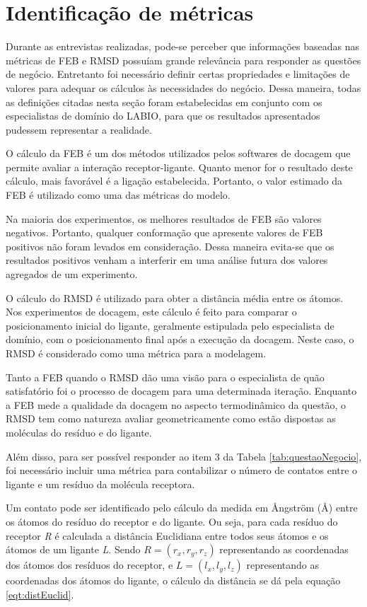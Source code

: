 \section{Identificação de métricas}
\label{sec:IdentificacaoDeMetricas}

Durante as entrevistas realizadas, pode-se perceber que informações baseadas nas métricas de FEB e RMSD possuíam grande relevância para responder as questões de negócio. Entretanto foi necessário definir certas propriedades e limitações de valores para adequar os cálculos às necessidades do negócio. Dessa maneira, todas as definições citadas nesta seção foram estabelecidas em conjunto com os especialistas de domínio do LABIO, para que os resultados apresentados pudessem representar a realidade.

O cálculo da FEB é um dos métodos utilizados pelos softwares de docagem que permite avaliar a interação receptor-ligante. Quanto menor for o resultado deste cálculo, mais favorável é a ligação estabelecida. Portanto, o valor estimado da FEB é utilizado como uma das métricas do modelo.

Na maioria dos experimentos, os melhores resultados de FEB são valores negativos. Portanto, qualquer conformação que apresente valores de FEB positivos não foram levados em consideração. Dessa maneira evita-se que os resultados positivos venham a interferir em uma análise futura dos valores agregados de um experimento. 

O cálculo do RMSD é utilizado para obter a distância média entre os átomos. Nos experimentos de docagem, este cálculo é feito para comparar o posicionamento inicial do ligante, geralmente estipulada pelo especialista de domínio, com o posicionamento final após a execução da docagem. Neste caso, o RMSD é considerado como uma métrica para a modelagem.

Tanto a FEB quando o RMSD dão uma visão para o especialista de quão satisfatório foi o processo de docagem para uma determinada iteração. Enquanto a FEB mede a qualidade da docagem no aspecto termodinâmico da questão, o RMSD tem como natureza avaliar geometricamente como estão dispostas as moléculas do resíduo e do ligante.

Além disso, para ser possível responder ao item 3 da Tabela \ref{tab:questaoNegocio}, foi necessário incluir uma métrica para contabilizar o número de contatos entre o ligante e um resíduo da molécula receptora. 

Um contato pode ser identificado pelo cálculo da medida em {\AA}ngstr\"om ({\AA}) entre os átomos do resíduo do receptor e do ligante. Ou seja, para cada resíduo do receptor \emph{R} é calculada a distância Euclidiana entre todos seus átomos e os átomos de um ligante \emph{L}. Sendo $R=(r_{x},r_{y},r_{z})$ representando as coordenadas dos átomos dos resíduos do receptor, e $L=(l_{x},l_{y},l_{z})$ representando as coordenadas dos átomos do ligante, o cálculo da distância se dá pela equação \ref{eqt:distEuclid}.

